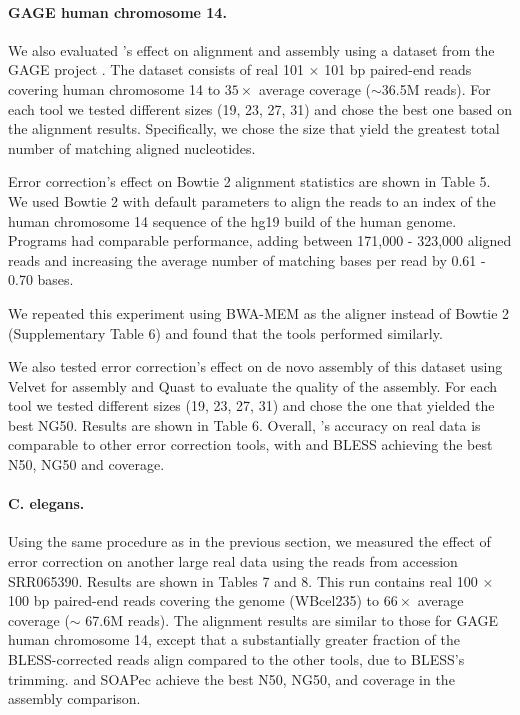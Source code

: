 \documentclass{bmcart}
\begin{document}
\paragraph{GAGE human chromosome 14.}
We also evaluated \tool's effect on alignment and assembly using a dataset from the GAGE project \cite{salzberg2012gage}.  The dataset consists of real 101 $\times$ 101 bp paired-end reads covering human chromosome 14 to $35\times$ average coverage ($\sim$36.5M reads).  For each tool we tested different \kmer sizes (19, 23, 27, 31) and chose the best one based on the alignment results.  Specifically, we chose the \kmer size that yield the greatest total number of matching aligned nucleotides.

Error correction's effect on Bowtie 2 alignment statistics are shown in Table 5.  We used Bowtie 2 with default parameters to align the reads to an index of the human chromosome 14 sequence of the hg19 build of the human genome.  Programs had comparable performance, adding between 171,000 - 323,000 aligned reads and increasing the average number of matching bases per read by 0.61 - 0.70 bases.

We repeated this experiment using BWA-MEM as the aligner instead of Bowtie 2 (Supplementary Table 6) and found that the tools performed similarly.

We also tested error correction's effect on de novo assembly of this dataset using Velvet for assembly and Quast to evaluate the quality of the assembly.  For each tool we tested different \kmer sizes (19, 23, 27, 31) and chose the one that yielded the best NG50.  Results are shown in Table 6.  Overall, \tool's accuracy on real data is comparable to other error correction tools, with \tool and BLESS achieving the best N50, NG50 and coverage.

\paragraph{C. elegans.}
Using the same procedure as in the previous section, we measured the effect of error correction on another large real data using the reads from accession SRR065390. Results are shown in Tables 7 and 8.  This run contains real 100 $\times$ 100 bp paired-end reads covering the \elegans genome (WBcel235) to $66\times$ average coverage ($\sim$ 67.6M reads).  The alignment results are similar to those for GAGE human chromosome 14, except that a substantially greater fraction of the BLESS-corrected reads align compared to the other tools, due to BLESS's trimming.  \tool and SOAPec achieve the best N50, NG50, and coverage in the assembly comparison.
\end{document}
